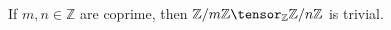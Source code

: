 If $m, n \in\mathbb{Z}$ are coprime, then $\mathbb{Z}/m\mathbb{Z} \tensor_\mathbb{Z} \mathbb{Z}/n\mathbb{Z}$ is
trivial.

